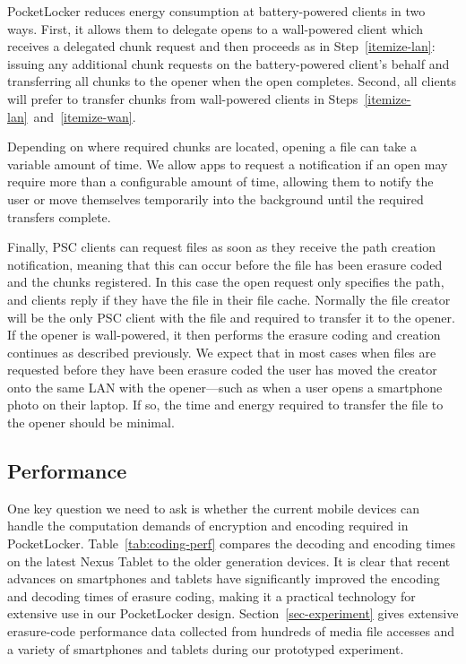 PocketLocker reduces energy consumption at battery-powered clients in two
ways. First, it allows them to delegate opens to a wall-powered client which
receives a delegated chunk request and then proceeds as in
Step~\ref{itemize-lan}: issuing any additional chunk requests on the
battery-powered client's behalf and transferring all chunks to the opener when
the open completes. Second, all clients will prefer to transfer chunks from
wall-powered clients in Steps~\ref{itemize-lan}~and~\ref{itemize-wan}.

Depending on where required chunks are located, opening a file
can take a variable amount of time.  We allow apps
to request a notification if an open may require more than a configurable
amount of time, allowing them to notify the user or move themselves
temporarily into the background until the required transfers complete.

Finally, PSC clients can request files as soon as they receive the path
creation notification, meaning that this can occur before the file has been
erasure coded and the chunks registered. In this case the open request only
specifies the path, and clients reply if they have the file in their file
cache. Normally the file creator will be the only PSC client with the file
and required to transfer it to the opener. If the opener is wall-powered, it
then performs the erasure coding and creation continues as described
previously. We expect that in most cases when files are requested before they
have been erasure coded the user has moved the creator onto the same LAN with
the opener---such as when a user opens a smartphone photo on their laptop. If
so, the time and energy required to transfer the file to the opener should be
minimal.

\subsection{Performance}
One key question we need to ask is whether the current mobile devices can
handle the computation demands of encryption and encoding required in
PocketLocker. Table~\ref{tab:coding-perf}
compares the decoding and encoding times on the latest Nexus Tablet
to the older generation devices.  It is clear that recent advances on smartphones
and tablets have significantly improved the encoding and decoding times of erasure coding, making
it a practical technology for extensive use in our PocketLocker design.
Section~\ref{sec-experiment} gives extensive erasure-code performance data collected from hundreds of media file accesses and a variety of smartphones and tablets during our prototyped experiment.

